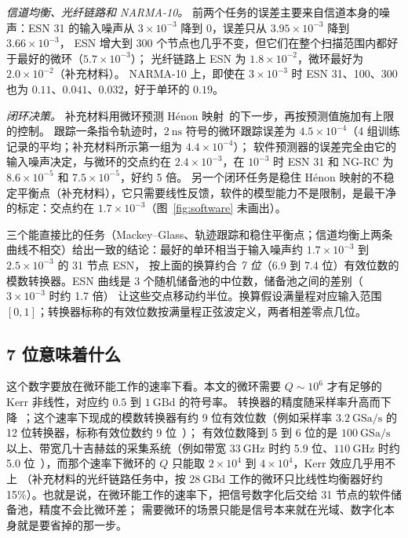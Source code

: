 \emph{信道均衡、光纤链路和 NARMA-10。} 前两个任务的误差主要来自信道本身的噪声：ESN 31 的输入噪声从 $3\times10^{-3}$ 降到 0，误差只从 $3.95\times10^{-3}$ 降到 $3.66\times10^{-3}$，
ESN 增大到 300 个节点也几乎不变，但它们在整个扫描范围内都好于最好的微环（$5.7\times10^{-3}$）；
光纤链路上 ESN 为 $1.8\times10^{-2}$，微环最好为 $2.0\times10^{-2}$（补充材料）。
NARMA-10 上，即使在 $3\times10^{-3}$ 时 ESN 31、100、300 也为 $0.11$、$0.041$、$0.032$，好于单环的 $0.19$。

\emph{闭环决策。} 补充材料用微环预测 Hénon 映射~\cite{henon1976}的下一步，再按预测值施加有上限的控制。
跟踪一条指令轨迹时，$2~\mathrm{ns}$ 符号的微环跟踪误差为 $4.5\times10^{-4}$（4 组训练记录的平均；补充材料所示第一组为 $4.4\times10^{-4}$）；
软件预测器的误差完全由它的输入噪声决定，与微环的交点约在 $2.4\times10^{-3}$，在 $10^{-3}$ 时 ESN 31 和 NG-RC 为 $8.6\times10^{-5}$ 和 $7.5\times10^{-5}$，好约 5 倍。
另一个闭环任务是稳住 Hénon 映射的不稳定平衡点（补充材料），它只需要线性反馈，软件的模型能力不是限制，是最干净的标定：交点约在 $1.7\times10^{-3}$（图~\ref{fig:software} 未画出）。

三个能直接比的任务（Mackey--Glass、轨迹跟踪和稳住平衡点；信道均衡上两条曲线不相交）给出一致的结论：最好的单环相当于输入噪声约 $1.7\times10^{-3}$ 到 $2.5\times10^{-3}$ 的 31 节点 ESN，
按上面的换算约合 \emph{7 位}（6.9 到 7.4 位）有效位数的模数转换器。ESN 曲线是 3 个随机储备池的中位数，储备池之间的差别（$3\times10^{-3}$ 时约 1.7 倍）
让这些交点移动约半位。换算假设满量程对应输入范围 $[0,1]$；转换器标称的有效位数按满量程正弦波定义，两者相差零点几位。

\subsection{7 位意味着什么}

这个数字要放在微环能工作的速率下看。本文的微环需要 $Q\sim10^{6}$ 才有足够的 Kerr 非线性，对应约 $0.5$ 到 $1~\mathrm{GBd}$ 的符号率。
转换器的精度随采样率升高而下降~\cite{walden1999}；这个速率下现成的模数转换器有约 9 位有效位数（例如采样率 $3.2~\mathrm{GSa/s}$ 的 12 位转换器，标称有效位数约 9 位~\cite{ti_adc12dj3200}）；
有效位数降到 5 到 6 位的是 $100~\mathrm{GSa/s}$ 以上、带宽几十吉赫兹的采集系统（例如带宽 $33~\mathrm{GHz}$ 时约 5.9 位、$110~\mathrm{GHz}$ 时约 5.0 位~\cite{keysight_uxr}），而那个速率下微环的 $Q$ 只能取 $2\times10^{4}$ 到 $4\times10^{4}$，Kerr 效应几乎用不上
（补充材料的光纤链路任务中，按 $28~\mathrm{GBd}$ 工作的微环只比线性均衡器好约 15\%）。也就是说，在微环能工作的速率下，把信号数字化后交给 31 节点的软件储备池，精度不会比微环差；
需要微环的场景只能是信号本来就在光域、数字化本身就是要省掉的那一步。

